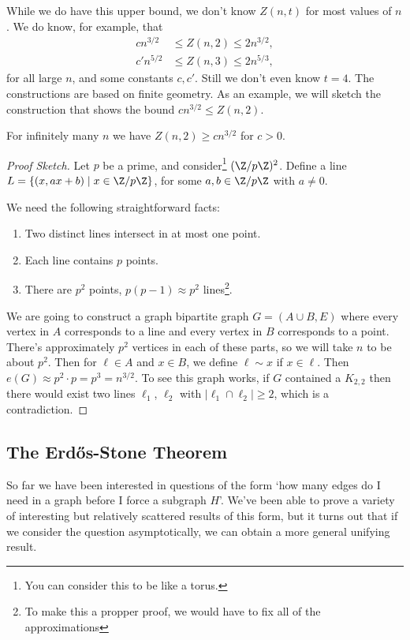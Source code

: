 While we do have this upper bound, we don't know $Z(n, t)$ for most values of $n$. We do know, for example, that
\begin{align*}
    cn^{3/2} &\leq Z(n, 2) \leq 2 n^{3/2}, \\
    c'n^{5/2} &\leq Z(n, 3) \leq 2 n^{5/3},
 \end{align*}
 for all large $n$, and some constants $c, c'$. Still we don't even know $t = 4$. The constructions are based on finite geometry. As an example, we will sketch the construction that shows the bound $cn^{3/2} \leq Z(n, 2)$.

\begin{theorem}
	For infinitely many $n$ we have $Z(n, 2) \geq cn^{3/2}$ for $c > 0$.
\end{theorem}
\begin{proof}[Proof Sketch]
	Let $p$ be a prime, and consider\footnote{You can consider this to be like a torus.} $(\Z/p\Z)^2$. Define a line $L = \{(x, ax + b) \mid x \in \Z/p\Z\}$, for some $a, b \in \Z/p\Z$ with $a \neq 0$.

	We need the following straightforward facts:
	\begin{enumerate}
		\item Two distinct lines intersect in at most one point.
		\item Each line contains $p$ points.
		\item There are $p^2$ points, $p(p - 1) \approx p^2$ lines\footnote{To make this a propper proof, we would have to fix all of the approximations}.
	\end{enumerate}

	We are going to construct a graph bipartite graph $G = (A \cup B, E)$ where every vertex in $A$ corresponds to a line and every vertex in $B$ corresponds to a point. There's approximately $p^2$ vertices in each of these parts, so we will take $n$ to be about $p^2$. Then for $\ell \in A$ and $x \in B$, we define $\ell \sim x$ if $x \in \ell$. Then $e(G) \approx p^2 \cdot p = p^3 = n^{3/2}$.
	To see this graph works, if $G$ contained a $K_{2,2}$ then there would exist two lines $\ell_1$, $\ell_2$ with $|\ell_1 \cap \ell_2| \geq 2$, which is a contradiction. 
\end{proof}

\subsection{The Erdős-Stone Theorem}

So far we have been interested in questions of the form `how many edges do I need in a graph before I force a subgraph $H$'. 
We've been able to prove a variety of interesting but relatively scattered results of this form, but it turns out that if we consider the question asymptotically, we can obtain a more general unifying result.


